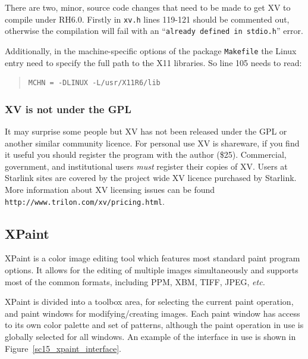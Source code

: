 \documentclass[twoside,11pt]{article}
\newcommand{\htmladdnormallink}[2]{#1}
\newcommand{\xlabel}[1]{}
\begin{document}
There are two, minor, source code changes that need to be made to get XV to compile under RH6.0. Firstly in {\tt xv.h} lines 119-121 should be commented out, otherwise the compilation will fail with an ``{\tt already defined in stdio.h}'' error.
\normalsize

Additionally, in the machine-specific options of the package {\tt Makefile} the Linux entry need to specify the full path to the X11 libraries. So line 105 needs to read:

\small
\begin{quote}
\begin{verbatim}
MCHN = -DLINUX -L/usr/X11R6/lib
\end{verbatim}
\end{quote}
\normalsize

\subsubsection{XV is {\bf not} under the GPL}

It may surprise some people but XV has not been released under the GPL or another similar community licence. For personal use XV is shareware, if you find it useful you should register the program with the author (\$25). Commercial, government, and institutional users {\em must} register their copies of XV. Users at Starlink sites are covered by the project wide XV licence purchased by Starlink. More information about XV licensing issues can be found \htmladdnormallink{{\tt http://www.trilon.com/xv/pricing.html}}{http://www.trilon.com/xv/pricing.html}.

\subsection{\xlabel{sc15_xpaint}XPaint\label{sc15_xpaint}}
 
\htmladdnormallink{XPaint}{http://home.worldonline.dk/~torsten/xpaint/} is a color image editing tool which  features most standard paint program options. It allows for the editing of multiple images simultaneously and supports most of the common formats, including PPM, XBM, TIFF, JPEG, {\em etc.}

XPaint is divided into a toolbox area, for selecting the current paint operation, and paint windows for modifying/creating images. Each paint window has access to its own color palette and set of patterns, although the paint operation in use is globally selected for all windows. An example of the interface in use is shown in Figure~\ref{sc15_xpaint_interface}.
\end{document}
